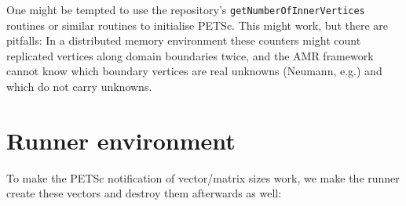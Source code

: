 \begin{remark}
 One might be tempted to use the repository's \texttt{getNumberOfInnerVertices}
 routines or similar routines to initialise PETSc.
 This might work, but there are pitfalls: In a distributed memory environment
 these counters might count replicated vertices along domain boundaries twice,
 and the AMR framework cannot know which boundary vertices are real unknowns
 (Neumann, e.g.) and which do not carry unknowns.
\end{remark}


\section{Runner environment}

To make the PETSc notification of vector/matrix sizes work, we make the runner
create these vectors and destroy them afterwards as well:

